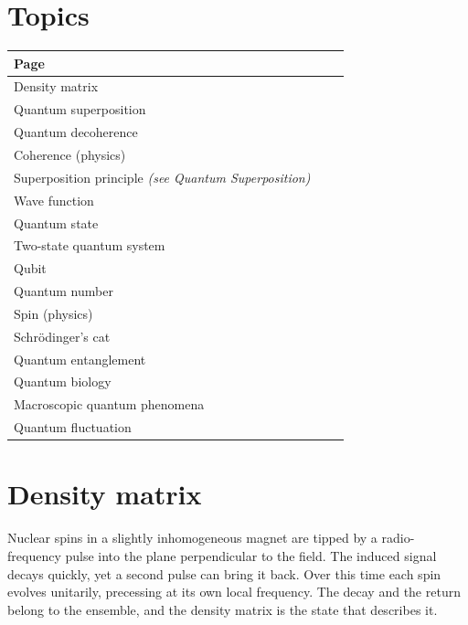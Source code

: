 \documentclass[11pt,oneside]{book}
\begin{document}
\section*{Topics}

\begin{longtable}{p{0.92\linewidth}}
\toprule
Page \\
\midrule
\endhead
{}\label{page:density-matrix}Density matrix \\
\label{page:quantum-superposition}Quantum superposition \\
\label{page:quantum-decoherence}Quantum decoherence \\
\label{page:coherence-physics}Coherence (physics) \\
\label{page:superposition-principle}Superposition principle \emph{(see Quantum Superposition)} \\
\label{page:wave-function}Wave function \\
\label{page:quantum-state}Quantum state \\
\label{page:two-state-quantum-system}Two-state quantum system \\
\label{page:qubit}Qubit \\
\label{page:quantum-number}Quantum number \\
\label{page:spin-physics}Spin (physics) \\
\label{page:schr-dinger-s-cat}Schrödinger's cat \\
\label{page:quantum-entanglement}Quantum entanglement \\
\label{page:quantum-biology}Quantum biology \\
\label{page:macroscopic-quantum-phenomena}Macroscopic quantum phenomena \\
\label{page:quantum-fluctuation}Quantum fluctuation \\
\bottomrule
\end{longtable}

\clearpage

\section{Density matrix}

\label{topic:density-matrix}

Nuclear spins in a slightly inhomogeneous magnet are tipped by a radio-frequency pulse into the plane perpendicular to the field. The induced signal decays quickly, yet a second pulse can bring it back. Over this time each spin evolves unitarily, precessing at its own local frequency. The decay and the return belong to the ensemble, and the density matrix is the state that describes it.
\end{document}
